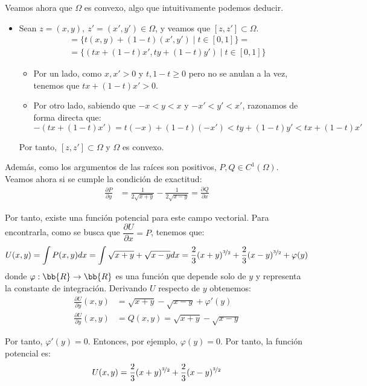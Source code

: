 \begin{ejercicio}
\begin{enumerate}
        Veamos ahora que $\Omega$ es convexo, algo que intuitivamente podemos deducir.
        \begin{itemize}
            \item Sean $z=(x,y),~z'=(x',y')\in\Omega$, y veamos que $[z,z']\subset\Omega$.
            \begin{align*}
                [z,z']&=\{t(x,y)+(1-t)(x',y')\mid t\in[0,1]\}
                =\\&= \{(tx+(1-t)x',ty+(1-t)y')\mid t\in[0,1]\}
            \end{align*}
            \begin{itemize}
                \item Por un lado, como $x,x'>0$ y $t,1-t\geq 0$ pero no se anulan a la vez, tenemos que $tx+(1-t)x'>0$.
                \item Por otro lado, sabiendo que $-x<y<x$ y $-x'<y'<x'$, razonamos de forma directa que:
                \begin{equation*}
                    -(tx+(1-t)x')=t(-x)+(1-t)(-x')<ty+(1-t)y'<tx+(1-t)x'
                \end{equation*}
            \end{itemize}
            Por tanto, $[z,z']\subset\Omega$ y $\Omega$ es convexo.
        \end{itemize}

        Además, como los argumentos de las raíces son positivos, $P,Q\in C^1(\Omega)$. Veamos ahora si se cumple la condición de exactitud:
        \begin{align*}
            \frac{\partial P}{\partial y} &= \frac{1}{2\sqrt{x+y}}-\frac{1}{2\sqrt{x-y}} = \frac{\partial Q}{\partial x}
        \end{align*}

        Por tanto, existe una función potencial para este campo vectorial. Para encontrarla, como se busca que $\dfrac{\partial U}{\partial x}=P$, tenemos que:
        \begin{equation*}
            U(x,y)=\int P(x,y)dx =
            \int \sqrt{x+y}+\sqrt{x-y}dx = \frac{2}{3}(x+y)^{\nicefrac{3}{2}}+\frac{2}{3}(x-y)^{\nicefrac{3}{2}}+\varphi(y)
        \end{equation*}
        donde $\varphi:\bb{R}\to\bb{R}$ es una función que depende solo de $y$ y representa la constante de integración. Derivando $U$ respecto de $y$ obtenemos:
        \begin{align*}
            \frac{\partial U}{\partial y}(x,y)&=\sqrt{x+y}-\sqrt{x-y}+\varphi'(y) \\
            \frac{\partial U}{\partial y}(x,y)&=Q(x,y)=\sqrt{x+y}-\sqrt{x-y}
        \end{align*}

        Por tanto, $\varphi'(y)=0$. Entonces, por ejemplo, $\varphi(y)=0$. Por tanto, la función potencial es:
        \begin{equation*}
            U(x,y)=\frac{2}{3}(x+y)^{\nicefrac{3}{2}}+\frac{2}{3}(x-y)^{\nicefrac{3}{2}}
        \end{equation*}
    \end{enumerate}
\end{ejercicio}

